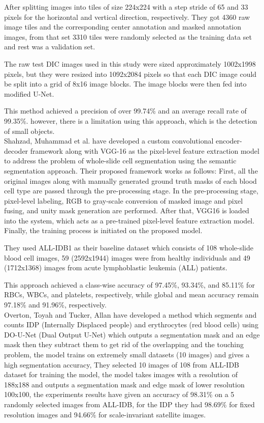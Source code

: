 \documentclass[conference]{IEEEtran}
\begin{document}
After splitting images into tiles of size 224x224 with a step stride of 65 and 33 pixels for the horizontal and vertical direction, respectively. They got 4360 raw image tiles and the corresponding center annotation and masked annotation images, from that set 3310 tiles were randomly selected as the training data set and rest was a validation set.

The raw test DIC images used in this study were sized approximately 1002x1998 pixels, but they were resized into 1092x2084 pixels so that each DIC image could be split into a grid of 8x16 image blocks. The image blocks were then fed into modified U-Net.

This method achieved a precision of over 99.74\% and an average recall rate of 99.35\%. however, there is a limitation using this approach, which is the detection of small objects.\\

Shahzad, Muhammad et al. \cite{shahzad2020robust} have developed a custom convolutional encoder-decoder framework along with VGG-16 as the pixel-level feature extraction model to address the problem of whole-slide cell segmentation using the semantic segmentation approach. Their proposed framework works as follows: First, all the original images along with manually generated ground truth masks of each blood cell type are passed through the pre-processing stage. In the pre-processing stage, pixel-level labeling, RGB to gray-scale conversion of masked image and pixel fusing, and unity mask generation are performed. After that, VGG16 is loaded into the system, which acts as a pre-trained pixel-level feature extraction model. Finally, the training process is initiated on the proposed model.

They used ALL-IDB1 as their baseline dataset which consists of 108 whole-slide blood cell images, 59 (2592x1944) images were from healthy individuals and 49 (1712x1368) images from acute lymphoblastic leukemia (ALL) patients.

This approach achieved a class-wise accuracy of 97.45\%, 93.34\%, and 85.11\% for RBCs, WBCs, and platelets, respectively, while global and mean accuracy remain 97.18\% and 91.96\%, respectively.\\

Overton, Toyah and Tucker, Allan \cite{10.1007/978-3-030-44584-3_31} have developed a method which segments and counts IDP (Internally Displaced people) and erythrocytes (red blood cells) using DO-U-Net (Dual Output U-Net) which outputs a segmentation mask and an edge mask then they subtract them to get rid of the overlapping and the touching problem, the model trains on extremely small datasets (10 images) and gives a high segmentation accuracy, They selected 10 images of 108 from ALL-IDB dataset for training the model, the model takes images with a resolution of 188x188 and outputs a segmentation mask and edge mask of lower resolution 100x100, the experiments results have given an accuracy of 98.31\% on a 5 randomly selected images from ALL-IDB, for the IDP they had 98.69\% for fixed resolution images and 94.66\% for scale-invariant satellite images.\\
\end{document}
